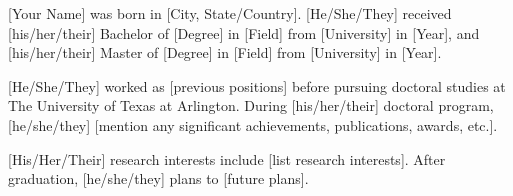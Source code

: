 [Your Name] was born in [City, State/Country]. [He/She/They] received [his/her/their] Bachelor of [Degree] in [Field] from [University] in [Year], and [his/her/their] Master of [Degree] in [Field] from [University] in [Year].

[He/She/They] worked as [previous positions] before pursuing doctoral studies at The University of Texas at Arlington. During [his/her/their] doctoral program, [he/she/they] [mention any significant achievements, publications, awards, etc.].

[His/Her/Their] research interests include [list research interests]. After graduation, [he/she/they] plans to [future plans].